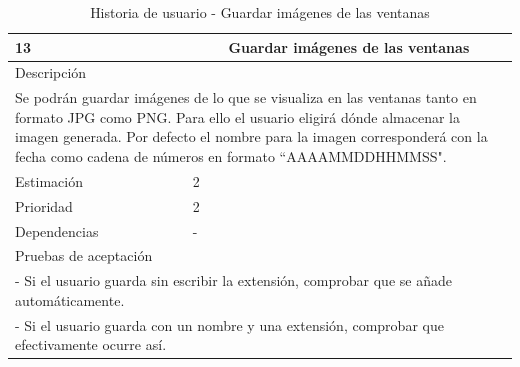 \begin{table}[H]
	\begin{center}
		\begin{tabular} {|l|c|l|}
			\hline
			13 & \multicolumn{2}{c|}{Guardar imágenes de las ventanas} \\ \hline \hline
			\multicolumn{3}{|l|}{Descripción} \\ \hline
			\multicolumn{3}{|p{12cm}|}{Se podrán guardar imágenes de lo que se visualiza en las ventanas tanto en formato JPG como PNG. Para ello el usuario eligirá dónde almacenar la imagen generada. Por defecto el nombre para la imagen corresponderá con la fecha como cadena de números en formato ``AAAAMMDDHHMMSS".} \\ \hline
			\multicolumn{2}{|l|}{Estimación} & 2 \\ \hline
			\multicolumn{2}{|l|}{Prioridad} & 2 \\ \hline
			\multicolumn{2}{|l|}{Dependencias} & - \\ \hline
			\multicolumn{3}{|l|}{Pruebas de aceptación} \\ \hline
			\multicolumn{3}{|p{12cm}|}{ - Si el usuario guarda sin escribir la extensión, comprobar que se añade automáticamente.} \\
			\multicolumn{3}{|p{12cm}|}{ - Si el usuario guarda con un nombre y una extensión, comprobar que efectivamente ocurre así.} \\ \hline
		\end{tabular}
	\end{center}
	\caption{Historia de usuario - Guardar imágenes de las ventanas}
	\label{tab:hu_guardar_imagenes_de_las_ventanas}
\end{table}

